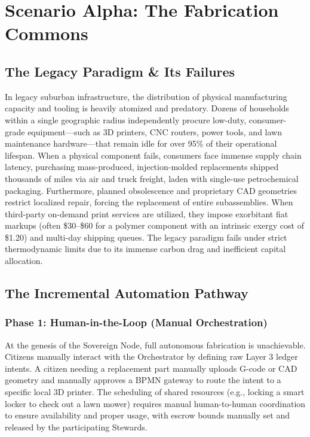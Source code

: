 \chapter{Scenario Alpha: The Fabrication Commons}

\section{The Legacy Paradigm \& Its Failures}
In legacy suburban infrastructure, the distribution of physical manufacturing capacity and tooling is heavily atomized and predatory. Dozens of households within a single geographic radius independently procure low-duty, consumer-grade equipment---such as 3D printers, CNC routers, power tools, and lawn maintenance hardware---that remain idle for over 95\% of their operational lifespan. When a physical component fails, consumers face immense supply chain latency, purchasing mass-produced, injection-molded replacements shipped thousands of miles via air and truck freight, laden with single-use petrochemical packaging. Furthermore, planned obsolescence and proprietary CAD geometries restrict localized repair, forcing the replacement of entire subassemblies. When third-party on-demand print services are utilized, they impose exorbitant fiat markups (often \$30--\$60 for a polymer component with an intrinsic exergy cost of \$1.20) and multi-day shipping queues. The legacy paradigm fails under strict thermodynamic limits due to its immense carbon drag and inefficient capital allocation.

\section{The Incremental Automation Pathway}

\subsection{Phase 1: Human-in-the-Loop (Manual Orchestration)}
At the genesis of the Sovereign Node, full autonomous fabrication is unachievable. Citizens manually interact with the Orchestrator by defining raw Layer 3 ledger intents. A citizen needing a replacement part manually uploads G-code or CAD geometry and manually approves a BPMN gateway to route the intent to a specific local 3D printer. The scheduling of shared resources (e.g., locking a smart locker to check out a lawn mower) requires manual human-to-human coordination to ensure availability and proper usage, with escrow bounds manually set and released by the participating Stewards.

